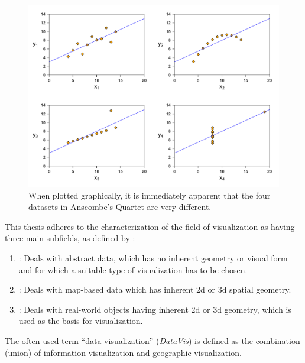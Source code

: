 \begin{figure}[tp]
\centering
\includegraphics[keepaspectratio,width=\linewidth,height=\halfh]
{diagrams/anscombe.pdf}
\caption[Anscombe's Quartet]{
When plotted graphically, it is immediately apparent that
the four datasets in Anscombe's Quartet are very different.
}
\label{fig:AnscombePlot}
\end{figure}







This thesis adheres to the characterization of the field of
visualization as having three main subfields, as defined by
\textcite{IVISCourseNotes}:
\begin{enumerate}
\item {}: Deals with
  abstract data, which has no inherent geometry or visual form and for
  which a suitable type of visualization has to be chosen.

\item {}: Deals with
  map-based data which has inherent 2d or 3d spatial geometry.

\item {}: Deals with
  real-world objects having inherent 2d or 3d geometry, which
  is used as the basis for visualization.
\end{enumerate}
The often-used term \enquote{data visualization} (\emph{DataVis}) is
defined as the combination (union) of information visualization and
geographic visualization.



